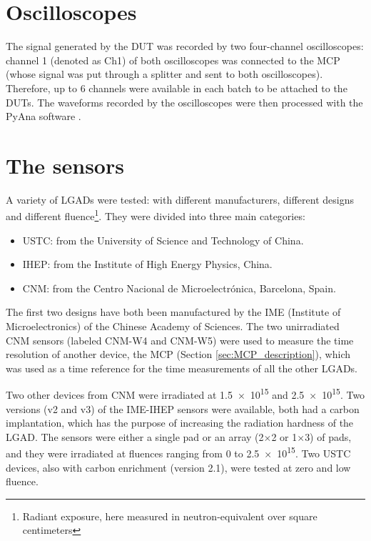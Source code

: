 \section{Oscilloscopes}
The signal generated by the DUT was recorded by two four-channel oscilloscopes: channel 1 (denoted as Ch1) of both oscilloscopes was connected to the MCP (whose signal was put through a splitter and sent to both oscilloscopes). Therefore, up to 6 channels were available in each batch to be attached to the DUTs.
The waveforms recorded by the oscilloscopes were then processed with the PyAna software \cite{atlas_hgtd_pyana_2025}. 


\section{The sensors}\label{sec:the_sensors}
A variety of LGADs were tested: with different manufacturers, different designs and different fluence\footnote{Radiant exposure, here measured in neutron-equivalent over square centimeters}. They were divided into three main categories:
\begin{itemize}
    \item USTC: from the University of Science and Technology of China.
    \item IHEP: from the Institute of High Energy Physics, China.
    \item CNM: from the Centro Nacional de Microelectr\'onica, Barcelona, Spain.
\end{itemize}

The first two designs have both been manufactured by the IME (Institute of Microelectronics) of the Chinese Academy of Sciences. The two unirradiated CNM sensors (labeled CNM-W4 and CNM-W5) were used to measure the time resolution of another device, the MCP (Section \ref{sec:MCP_description}), which was used as a time reference for the time measurements of all the other LGADs. 

Two other devices from CNM were irradiated at \qty{1.5e15}{\neutroneq} and \qty{2.5e15}{\neutroneq}. Two versions (v2 and v3) of the IME-IHEP sensors were available, both had a carbon implantation, which has the purpose of increasing the radiation hardness of the LGAD. The sensors were either a single pad or an array (2\(\times\)2 or 1\(\times\)3) of pads, and they were irradiated at fluences ranging from \(0\) to \qty{2.5e15}{\neutroneq}. Two USTC devices, also with carbon enrichment (version 2.1), were tested at zero and low fluence. 

